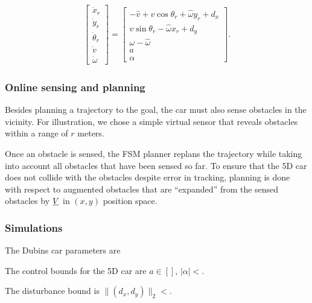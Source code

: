 \begin{equation}
\label{eq:5D_and_3D_rdyn}
\begin{aligned}
\left[
\begin{array}{c}
\dot x_r\\
\dot y_r\\
\dot\theta_r\\
\dot v\\
\dot \omega
\end{array}
\right]
=
\left[
\begin{array}{c}
- \hat v + v \cos \theta_r + \hat \omega y_r + d_x\\
v \sin \theta_r - \hat \omega x_r + d_y\\
\omega - \hat \omega \\
a\\
\alpha
\end{array}
\right].
\end{aligned}
\end{equation}



\subsubsection{Online sensing and planning}
Besides planning a trajectory to the goal, the car must also sense obstacles in the vicinity. For illustration, we chose a simple virtual sensor that reveals obstacles within a range of $r$ meters.

Once an obstacle is sensed, the FSM planner replans the trajectory while taking into account all obstacles that have been sensed so far. 
To ensure that the 5D car does not collide with the obstacles despite error in tracking, planning is done with respect to augmented obstacles that are ``expanded'' from the sensed obstacles by $\underline{V}$ in $(x,y)$ position space.


\subsubsection{Simulations}

The Dubins car parameters are

The control bounds for the 5D car are $a \in []$, $|\alpha| < $.

The disturbance bound is $\|(d_x, d_y)\|_2 < $.

